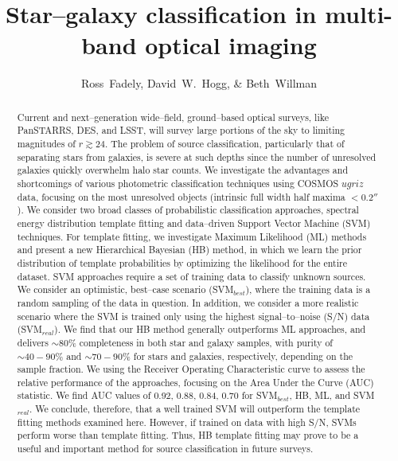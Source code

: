 \documentclass[12pt,preprint]{aastex}
\begin{document}
\title{Star--galaxy classification in multi-band optical imaging}
\author{Ross~Fadely,
        David~W.~Hogg,
        \& Beth~Willman}


%
%
\begin{abstract}

  Current and next--generation wide--field, ground--based optical
  surveys, like PanSTARRS, DES, and LSST, will survey large portions
  of the sky to limiting magnitudes of $r \gtrsim 24$.  The problem of
  source classification, particularly that of separating stars from
  galaxies, is severe at such depths since the number of unresolved
  galaxies quickly overwhelm halo star counts.  We investigate the
  advantages and shortcomings of various photometric classification
  techniques using COSMOS $ugriz$ data, focusing on the most
  unresolved objects (intrinsic full width half maxima $<0.2''$).  We
  consider two broad classes of probabilistic classification
  approaches, spectral energy distribution template fitting and
  data--driven Support Vector Machine (SVM) techniques.  For template
  fitting, we investigate Maximum Likelihood (ML) methods and present
  a new Hierarchical Bayesian (HB) method, in which we learn the prior
  distribution of template probabilities by optimizing the likelihood
  for the entire dataset.  SVM approaches require a set of training
  data to classify unknown sources.  We consider an optimistic,
  best--case scenario (SVM$_{best}$), where the training data is a
  random sampling of the data in question.  In addition, we consider
  a more realistic scenario where the SVM is trained only using the highest
  signal--to--noise (S/N) data (SVM$_{real}$).  We find that our
  HB method generally outperforms ML approaches, and delivers
  $\sim80\%$ completeness in both star and galaxy samples, with purity
  of $\sim40-90\%$ and $\sim70-90\%$ for stars and galaxies,
  respectively, depending on the sample fraction.  We using the
  Receiver Operating Characteristic curve to assess the relative
  performance of the approaches, focusing on the Area Under the Curve
  (AUC) statistic.  We find AUC values of 0.92, 0.88, 0.84, 0.70 for
  SVM$_{best}$, HB, ML, and SVM$_{real}$.  We conclude,
  therefore, that a well trained SVM will outperform the template
  fitting methods examined here.  However, if trained on data with
  high S/N, SVMs perform worse than template fitting.  Thus, HB
  template fitting may prove to be a useful and important method for
  source classification in future surveys.

\end{abstract}
\end{document}
